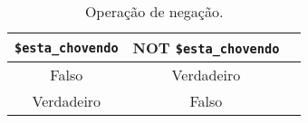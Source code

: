 \begin{table}[h]
\caption{Operação de negação.}\label{tab:cap4-operacao-de-negacao}
\begin{center}
\begin{tabular}{|c|c|c|}
\hline
  \multicolumn{1}{|c|}{ \textbf{\texttt{\$esta\_chovendo}}}
&  \multicolumn{1}{|c|}{ \textbf{NOT \texttt{\$esta\_chovendo}}} \\
\hline
\hline
Falso       & Verdadeiro \\ \hline
Verdadeiro  & Falso \\ \hline
\end{tabular}
\end{center}
\end{table}
